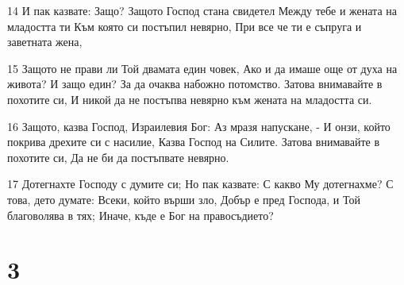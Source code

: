 \par 14 И пак казвате: Защо? Защото Господ стана свидетел Между тебе и жената на младостта ти Към която си постъпил невярно, При все че ти е съпруга и заветната жена,
\par 15 Защото не прави ли Той двамата един човек, Ако и да имаше още от духа на живота? И защо един? За да очаква набожно потомство. Затова внимавайте в похотите си, И никой да не постъпва невярно към жената на младостта си.
\par 16 Защото, казва Господ, Израилевия Бог: Аз мразя напускане, - И онзи, който покрива дрехите си с насилие, Казва Господ на Силите. Затова внимавайте в похотите си, Да не би да постъпвате невярно.
\par 17 Дотегнахте Господу с думите си; Но пак казвате: С какво Му дотегнахме? С това, дето думате: Всеки, който върши зло, Добър е пред Господа, и Той благоволява в тях; Иначе, къде е Бог на правосъдието?

\chapter{3}

